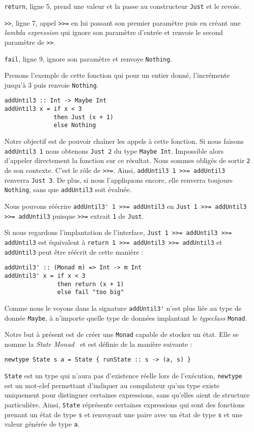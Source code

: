 \documentclass{llncs}
\begin{document}
\lstinline{return}, ligne 5, prend une valeur et la passe au constructeur
\lstinline{Just} et le revoie.

\lstinline{>>}, ligne 7, appel \lstinline{>>=} en lui passant son premier paramètre
puis en créant une \emph{lambda expression} qui ignore son paramètre d'entrée
et renvoie le second paramètre de \lstinline{>>}.

\lstinline{fail}, ligne 9, ignore son paramètre et renvoye \lstinline{Nothing}.

Prenons l'exemple de cette fonction qui pour un entier donné, l'incrémente jusqu'à
3 puis renvoie \lstinline{Nothing}.
\begin{lstlisting}
addUntil3 :: Int -> Maybe Int
addUntil3 x = if x < 3
              then Just (x + 1)
              else Nothing
\end{lstlisting}

Notre objectif est de pouvoir chaîner les appels à cette fonction.
Si nous faisons \lstinline{addUntil3 1} nous obtenons \lstinline{Just 2} du type \lstinline{Maybe Int}.
Impossible alors d'appeler directement la fonction sur ce résultat.
Nous sommes obligés de sortir \lstinline{2} de son contexte.
C'est le rôle de \lstinline{>>=}.
Ainsi, \lstinline{addUntil3 1 >>= addUntil3} renverra \lstinline{Just 3}.
De plus, si nous l'appliquons encore, elle renverra toujours \lstinline{Nothing},
sans que \lstinline{addUntil3} soit évaluée.

Nous pouvons réécrire \lstinline{addUntil3' 1 >>= addUntil3} en \lstinline{Just 1 >>= addUntil3 >>= addUntil3}
puisque \lstinline{>>=} extrait \lstinline{1} de \lstinline{Just}.

Si nous regardons l'implantation de l'interface, \lstinline{Just 1 >>= addUntil3 >>= addUntil3}
est équivalent à \lstinline{return 1 >>= addUntil3 >>= addUntil3} et \lstinline{addUntil3}
peut être réécrit de cette manière :
\begin{lstlisting}
addUntil3' :: (Monad m) => Int -> m Int
addUntil3' x = if x < 3
               then return (x + 1)
               else fail "too big"
\end{lstlisting}

Comme nous le voyons dans la signature \lstinline{addUntil3'} n'est plus liée au type
de donnée \lstinline{Maybe}, à n'importe quelle type de données implantant le \emph{typeclass}
\lstinline{Monad}.

Notre but à présent est de créer une \lstinline{Monad} capable de stocker un état.
Elle se nomme la \emph{State Monad}~\cite{PeytonJones95} et est définie de la manière
suivante :
\begin{lstlisting}
newtype State s a = State { runState :: s -> (a, s) }
\end{lstlisting}
\lstinline{State} est un type qui n'aura pas d'existence réelle lors de l'exécution,
\lstinline{newtype} est un mot-clef permettant d'indiquer au compilateur qu'un type
existe uniquement pour distinguer certaines expressions, sans qu'elles aient de
structure particulière.
Ainsi, \lstinline{State} réprésente certaines expressions qui sont des fonctions
prenant un état de type \lstinline{s} et renvoyant une paire avec un état
de type \lstinline{s} et une valeur générée de type \lstinline{a}.
\end{document}
